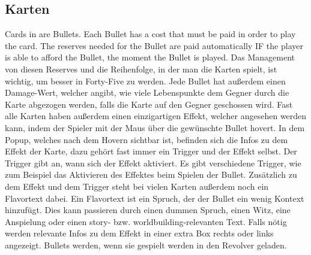 \subsection{Karten}\label{Karten}
Cards in \FF are Bullets. Each Bullet has a cost that must be paid in order to play the card.
The reserves needed for the Bullet are paid automatically IF the player is able to afford the Bullet, the moment the Bullet is played.
Das Management von diesen Reserves und die Reihenfolge, in der man die Karten spielt, ist wichtig, um besser in Forty-Five zu werden. %
Jede Bullet hat außerdem einen Damage-Wert, welcher angibt, wie viele Lebenspunkte dem Gegner durch die Karte abgezogen werden,
falls die Karte auf den Gegner geschossen wird. Fast alle Karten haben außerdem einen einzigartigen Effekt,
welcher angesehen werden kann, indem der Spieler mit der Maus über die gewünschte Bullet hovert.
In dem Popup, welches nach dem Hovern sichtbar ist, befinden sich die Infos zu dem Effekt der Karte,
dazu gehört fast immer ein Trigger und der Effekt selbst.
Der Trigger gibt an, wann sich der Effekt aktiviert. Es gibt verschiedene Trigger, wie zum Beispiel das Aktivieren des Effektes beim Spielen der Bullet. %
Zusätzlich zu dem Effekt und dem Trigger steht bei vielen Karten außerdem noch ein Flavortext dabei.
Ein Flavortext ist ein Spruch, der der Bullet ein wenig Kontext hinzufügt.
Dies kann passieren durch einen dummen Spruch, einen Witz, eine Anspielung oder einen story- bzw. worldbuilding-relevanten Text.
Falls nötig werden relevante Infos zu dem Effekt in einer extra Box rechts oder links angezeigt.
Bullets werden, wenn sie gespielt werden in den Revolver geladen.


